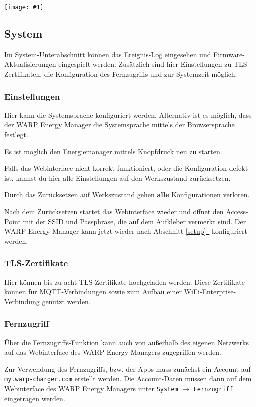 \documentclass[a4paper,10pt]{article}
\newcommand{\hint}[1]{\begin{tcolorbox}[colback=boxgray,colframe=black,coltext=
white,title=Hinweis,left*=2mm,right*=2mm,boxsep=1mm,bottom=1mm,top=1mm]#1\end{tcolorbox}}
\newcommand{\gfx}[1]{\texttt{[image: \#1]}}
\newcommand*{\fullref}[1]{Abschnitt \hyperref[{#1}]{\ref*{#1}~\nameref*{#1}}}
\newcommand\rurl[2]{%
  \href{#1}{\nolinkurl{#2}}%
}
\begin{document}
\begin{multicols*}{2}
	\gfx{./img/resized/web_mqtt}

	\subsection{System}
    Im System-Unterabschnitt können das Ereignis-Log eingesehen und Firmware-Aktualisierungen eingespielt werden. Zusätzlich sind hier Einstellungen zu TLS-Zertifikaten, die Konfiguration des Fernzugriffs und zur Systemzeit möglich.

    \subsubsection{Einstellungen}
    \label{einstellungen}

    Hier kann die Systemsprache konfiguriert werden. Alternativ ist es möglich, dass der WARP Energy Manager
    die Systemsprache mittels der Browsersprache festlegt.

    Es ist möglich den Energiemanager mittels Knopfdruck neu zu starten.

	Falls das Webinterface nicht korrekt funktioniert, oder die Konfiguration defekt ist,
	kannst du hier alle Einstellungen auf den Werkszustand zurücksetzen.
	\hint{Durch das Zurücksetzen auf Werkszustand gehen \mbox{\textbf{alle}} Konfigurationen verloren.}
	Nach dem Zurücksetzen startet das Webinterface wieder und öffnet
	den Access-Point mit der SSID und Passphrase, die auf dem Aufkleber vermerkt
	sind. Der WARP Energy Manager kann jetzt wieder nach \fullref{setup} konfiguriert werden.


    \subsubsection{TLS-Zertifikate}
    Hier können bis zu acht TLS-Zertifikate hochgeladen werden. Diese Zertifikate können
    für MQTT-Verbindungen sowie zum Aufbau einer WiFi-Enterprise-Verbindung genutzt werden.

    \subsubsection{Fernzugriff}

    Über die Fernzugriffs-Funktion kann auch von außerhalb des eigenen Netzwerks auf das Webinterface des WARP Energy Managers zugegriffen werden.

    Zur Verwendung des Fernzugriffs, bzw. der Apps muss zunächst ein Account auf \rurl{https://my.warp-charger.com}{my.warp-charger.com} erstellt werden. Die Account-Daten müssen dann auf dem Webinterface des WARP Energy Managers unter \texttt{System} $\rightarrow$ \texttt{Fernzugriff} eingetragen werden.


\end{multicols*}
\end{document}
